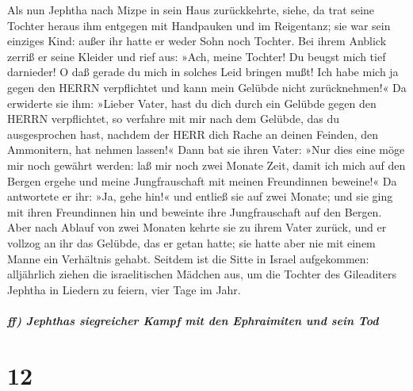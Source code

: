 Als nun Jephtha nach Mizpe in sein Haus zurückkehrte,
siehe, da trat seine Tochter heraus ihm entgegen mit Handpauken und im
Reigentanz; sie war sein einziges Kind: außer ihr hatte er weder Sohn
noch Tochter. Bei ihrem Anblick zerriß er seine Kleider
und rief aus: »Ach, meine Tochter! Du beugst mich tief darnieder! O daß
gerade du mich in solches Leid bringen mußt! Ich habe mich ja gegen den
HERRN verpflichtet und kann mein Gelübde nicht zurücknehmen!«
Da erwiderte sie ihm: »Lieber Vater, hast du dich durch
ein Gelübde gegen den HERRN verpflichtet, so verfahre mit mir nach dem
Gelübde, das du ausgesprochen hast, nachdem der HERR dich Rache an
deinen Feinden, den Ammonitern, hat nehmen lassen!« Dann
bat sie ihren Vater: »Nur dies eine möge mir noch gewährt werden: laß
mir noch zwei Monate Zeit, damit ich mich auf den Bergen ergehe und
meine Jungfrauschaft mit meinen Freundinnen beweine!« Da
antwortete er ihr: »Ja, gehe hin!« und entließ sie auf zwei Monate; und
sie ging mit ihren Freundinnen hin und beweinte ihre Jungfrauschaft auf
den Bergen. Aber nach Ablauf von zwei Monaten kehrte sie
zu ihrem Vater zurück, und er vollzog an ihr das Gelübde, das er getan
hatte; sie hatte aber nie mit einem Manne ein Verhältnis gehabt. Seitdem
ist die Sitte in Israel aufgekommen: alljährlich ziehen
die israelitischen Mädchen aus, um die Tochter des Gileaditers Jephtha
in Liedern zu feiern, vier Tage im Jahr.

\hypertarget{ff-jephthas-siegreicher-kampf-mit-den-ephraimiten-und-sein-tod}{%
\subparagraph{ff) Jephthas siegreicher Kampf mit den Ephraimiten und
sein
Tod}\label{ff-jephthas-siegreicher-kampf-mit-den-ephraimiten-und-sein-tod}}

\hypertarget{section-11}{%
\section{12}\label{section-11}}

